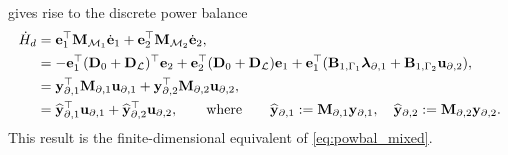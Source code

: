 gives rise to the discrete power balance
\begin{equation}
\begin{aligned}
\dot{H}_d &= \mathbf{e}_1^\top \mathbf{M}_{\mathcal{M}_1} \dot{\mathbf{e}}_1 + \mathbf{e}_2^\top \mathbf{M}_{\mathcal{M}_2} \dot{\mathbf{e}}_2, \\
&= -\mathbf{e}_1^\top (\mathbf{D}_0+\mathbf{D}_\mathcal{L})^\top {\mathbf{e}}_2 + \mathbf{e}_2^\top (\mathbf{D}_0+\mathbf{D}_\mathcal{L}) {\mathbf{e}}_1 + \mathbf{e}_1^\top (\mathbf{B}_{1, \Gamma_1} \bm{\lambda}_{\partial, 1} + \mathbf{B}_{1, \Gamma_2} \mathbf{u}_{\partial, 2} ), \\
&= \mathbf{y}_{\partial, 1}^\top \mathbf{M}_{\partial, 1} \mathbf{u}_{\partial, 1} + \mathbf{y}_{\partial, 2}^\top \mathbf{M}_{\partial, 2} \mathbf{u}_{\partial, 2}, \\
&= \widehat{\mathbf{y}}_{\partial, 1}^\top \mathbf{u}_{\partial, 1} + \widehat{\mathbf{y}}_{\partial, 2}^\top \mathbf{u}_{\partial, 2}, \qquad \text{where} \qquad \widehat{\mathbf{y}}_{\partial, 1} :=\mathbf{M}_{\partial, 1} \mathbf{y}_{\partial, 1}, \quad \widehat{\mathbf{y}}_{\partial, 2} :=\mathbf{M}_{\partial, 2} \mathbf{y}_{\partial, 2}.
\end{aligned}
\end{equation}
This result is the finite-dimensional equivalent of \eqref{eq:powbal_mixed}.

